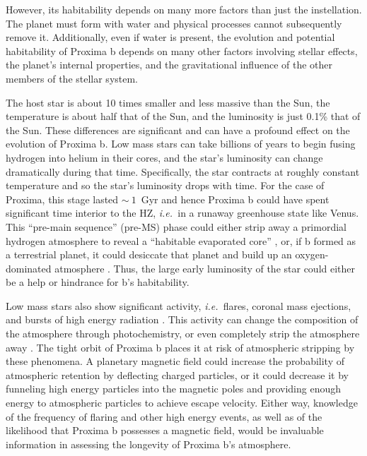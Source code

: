 \documentclass[preprint,12pt]{aastex}
\def\eg{{\it e.g.\ }}
\def\ie{{\it i.e.\ }}
\begin{document}
However, its habitability depends on many more factors than just the
instellation. The planet must form with water and physical processes
cannot subsequently remove it. Additionally, even if water is present,
the evolution and potential habitability of Proxima b depends on many
other factors involving stellar effects, the planet's internal properties, and the
gravitational influence of the other members of the stellar system.

The host star is about 10 times smaller and less massive than the Sun,
the temperature is about half that of the Sun, and the luminosity is
just 0.1\% that of the Sun. These differences are significant and can
have a profound effect on the evolution of Proxima b. Low mass stars
can take billions of years to begin fusing hydrogen into helium in
their cores, and the star's luminosity can change dramatically during that
time. Specifically, the star contracts at roughly constant temperature and so
the star's luminosity drops with time. For the case of Proxima, this
stage lasted $\sim~1$~Gyr \citep{Baraffe15} and hence Proxima b
could have spent significant time interior to the HZ, \ie in a runaway
greenhouse state like Venus. This ``pre-main sequence'' (pre-MS) phase could
either strip away a primordial hydrogen atmosphere to reveal a
``habitable evaporated core'' \citep{Luger15}, or, if b formed as a
terrestrial planet, it could desiccate that planet and build up an
oxygen-dominated atmosphere \citep{LugerBarnes15}. Thus, the large
early luminosity of the star could either be a help or hindrance for
b's habitability.

Low mass stars also show significant activity, \ie flares, coronal
mass ejections, and bursts of high energy radiation
\citep[\eg][]{West08}. This activity can change the composition of the
atmosphere through photochemistry, or even completely strip the
atmosphere away \citep{Raymond06}. The tight orbit of Proxima b places
it at risk of atmospheric stripping by these phenomena. A planetary
magnetic field could increase the probability of atmospheric retention
by deflecting charged particles, or it could decrease it by funneling
high energy particles into the magnetic poles and providing enough
energy to atmospheric particles to achieve escape velocity. Either
way, knowledge of the frequency of flaring and other high energy
events, as well as of the likelihood that Proxima b possesses a
magnetic field, would be invaluable information in assessing the
longevity of Proxima b's atmosphere.
\end{document}
